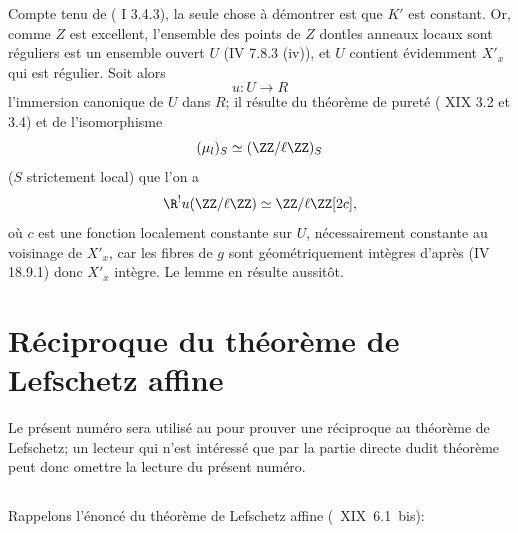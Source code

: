 \enlargethispage{\baselineskip}%
Compte tenu de ( I 3.4.3), la seule chose \`a d\'emontrer est que $K'$ est constant. Or, comme $Z$ est excellent, l'ensemble des points de $Z$ dont\pageoriginale les anneaux locaux sont r\'eguliers est un ensemble ouvert $U$ (\EGA IV 7.8.3 \textup{(iv)}), et $U$ contient \'evidemment $X'_x$ qui est r\'egulier. Soit alors
$$u:U\to R$$
l'immersion canonique de $U$ dans $R$; il r\'esulte du th\'eor\`eme de puret\'e ( XIX 3.2 et 3.4) et de l'isomorphisme
$$(\mu_l)_S\simeq(\ZZ/\ell\ZZ)_S$$
($S$ strictement local) que l'on a
$$
\R^!u(\ZZ/\ell\ZZ)\simeq\ZZ/\ell\ZZ[2c],
$$
o\`u $c$ est une fonction localement constante sur $U$, n\'ecessairement constante au voisinage de $X'_x$, car les fibres de $g$ sont g\'eom\'etriquement int\`egres d'apr\`es (\EGA IV 18.9.1) donc $X'_x$ int\`egre. Le lemme en r\'esulte aussit\^{o}t.

\section{R\'eciproque du th\'eor\`eme de Lefschetz affine} \label{XIV.3}

Le pr\'esent num\'ero sera utilis\'e au \numero {} pour prouver une r\'eciproque au \og th\'eor\`eme de Lefschetz\fg; un lecteur qui n'est int\'eress\'e que par la partie directe dudit th\'eor\`eme peut donc omettre la lecture du pr\'esent num\'ero.

\subsection{} \label{XIV.3.1}

Rappelons l'\'enonc\'e du th\'eor\`eme de Lefschetz affine (~XIX~6.1~bis):

